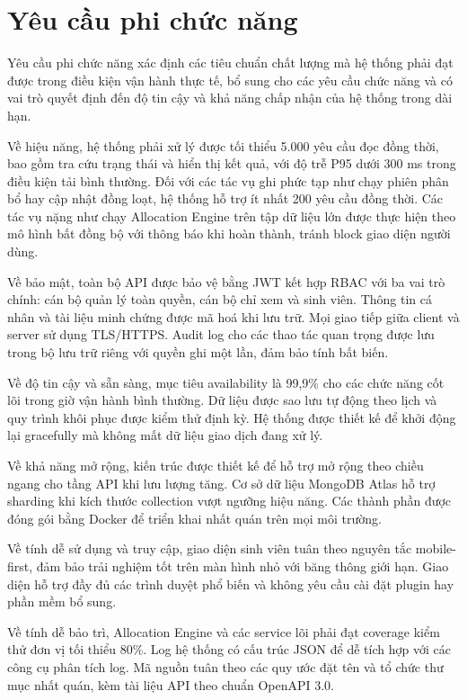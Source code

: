 ﻿\documentclass[a4paper,12pt,openany,oneside]{report}
\begin{document}
\section{Yêu cầu phi chức năng}
\label{sec:nonfunctional}

Yêu cầu phi chức năng xác định các tiêu chuẩn chất lượng mà hệ thống phải đạt
được trong điều kiện vận hành thực tế, bổ sung cho các yêu cầu chức năng và có
vai trò quyết định đến độ tin cậy và khả năng chấp nhận của hệ thống trong dài
hạn.

Về hiệu năng, hệ thống phải xử lý được tối thiểu 5.000 yêu cầu đọc đồng thời,
bao gồm tra cứu trạng thái và hiển thị kết quả, với độ trễ P95 dưới 300 ms
trong điều kiện tải bình thường. Đối với các tác vụ ghi phức tạp như chạy phiên
phân bổ hay cập nhật đồng loạt, hệ thống hỗ trợ ít nhất 200 yêu cầu đồng thời.
Các tác vụ nặng như chạy Allocation Engine trên tập dữ liệu lớn được thực hiện
theo mô hình bất đồng bộ với thông báo khi hoàn thành, tránh block giao diện
người dùng.

Về bảo mật, toàn bộ API được bảo vệ bằng JWT kết hợp RBAC với ba vai trò chính:
cán bộ quản lý toàn quyền, cán bộ chỉ xem và sinh viên. Thông tin cá nhân và
tài liệu minh chứng được mã hoá khi lưu trữ. Mọi giao tiếp giữa client và
server sử dụng TLS/HTTPS. Audit log cho các thao tác quan trọng được lưu trong
bộ lưu trữ riêng với quyền ghi một lần, đảm bảo tính bất biến.

Về độ tin cậy và sẵn sàng, mục tiêu availability là 99,9\% cho các chức năng
cốt lõi trong giờ vận hành bình thường. Dữ liệu được sao lưu tự động theo lịch
và quy trình khôi phục được kiểm thử định kỳ. Hệ thống được thiết kế để khởi
động lại gracefully mà không mất dữ liệu giao dịch đang xử lý.

Về khả năng mở rộng, kiến trúc được thiết kế để hỗ trợ mở rộng theo chiều ngang
cho tầng API khi lưu lượng tăng. Cơ sở dữ liệu MongoDB Atlas hỗ trợ sharding
khi kích thước collection vượt ngưỡng hiệu năng. Các thành phần được đóng gói
bằng Docker để triển khai nhất quán trên mọi môi trường.

Về tính dễ sử dụng và truy cập, giao diện sinh viên tuân theo nguyên tắc
mobile-first, đảm bảo trải nghiệm tốt trên màn hình nhỏ với băng thông giới
hạn. Giao diện hỗ trợ đầy đủ các trình duyệt phổ biến và không yêu cầu cài đặt
plugin hay phần mềm bổ sung.

Về tính dễ bảo trì, Allocation Engine và các service lõi phải đạt coverage kiểm
thử đơn vị tối thiểu 80\%. Log hệ thống có cấu trúc JSON để dễ tích hợp với các
công cụ phân tích log. Mã nguồn tuân theo các quy ước đặt tên và tổ chức thư
mục nhất quán, kèm tài liệu API theo chuẩn OpenAPI 3.0.
\end{document}
